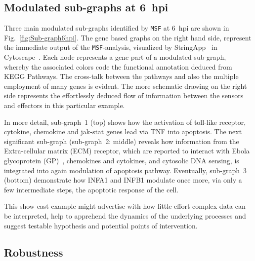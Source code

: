 \documentclass[10pt,a4paper,twocolumn]{article}
\begin{document}
\subsection*{Modulated sub-graphs at 6~hpi}

Three main modulated sub-graphs identified by \texttt{MSF} at 6~hpi are
shown in Fig.~\ref{fig:Sub-graph6hpi}. The gene based graphs on the right
hand side, represent the immediate output of the \texttt{MSF}-analysis,
visualized by StringApp~\cite{StringApp} in Cytoscape~\cite{Cyto}. Each
node represents a gene part of a modulated sub-graph, whereby the
associated colors code the functional annotation deduced from KEGG
Pathways. The cross-talk between the pathways and also the multiple
employment of many genes is evident. The more schematic drawing on the
right side represents the effortlessly deduced flow of information between
the sensors and effectors in this particular example.

In more detail, sub-graph~1 (top) shows how the activation of toll-like
receptor, cytokine, chemokine and jak-stat genes lead via TNF into
apoptosis. The next significant sub-graph (sub-graph~2: middle) reveals
how information from the Extra-cellular matrix (ECM) receptor, which are
reported to interact with Ebola glycoprotein (GP)~\cite{Veljkovic},
chemokines and cytokines, and cytosolic DNA sensing, is integrated into
again modulation of apoptosis pathway. Eventually, sub-graph~3 (bottom)
demonstrate how INFA1 and INFB1 modulate once more, via only a few
intermediate steps, the apoptotic response of the cell.

This show cast example might advertise with how little effort complex data
can be interpreted, help to apprehend the dynamics of the underlying
processes and suggest testable hypothesis and potential points of
intervention.

\subsection*{Robustness}
\end{document}
